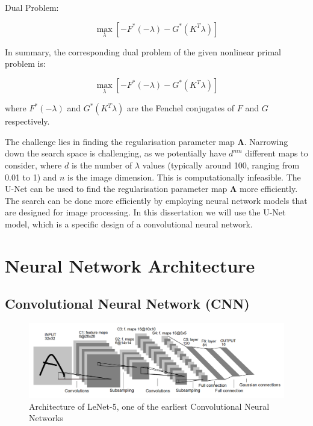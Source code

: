 \documentclass[12pt]{article}
\begin{document}
Dual Problem:

\begin{equation}
\max_{\lambda} \left[ -F^*(-\lambda) - G^*(K^T \lambda) \right]
\end{equation}

In summary, the corresponding dual problem of the given nonlinear primal problem is:

\begin{equation}
\max_{\lambda} \left[ -F^*(-\lambda) - G^*(K^T \lambda) \right]
\end{equation}

where \( F^*(-\lambda) \) and \( G^*(K^T \lambda) \) are the Fenchel conjugates of \( F \) and \( G \) respectively.



The challenge lies in finding the regularisation parameter map $\mathbf{\Lambda}$.  
Narrowing down the search space is challenging, as we potentially have $d^{m n}$ different maps to consider, where $d$ is the number of $\lambda$ values (typically around 100, ranging from 0.01 to 1) and $n$ is the image dimension. This is computationally infeasible. The U-Net can be used to find the 
regularisation parameter map $\mathbf{\Lambda}$
more efficiently.
The search can be done more efficiently by employing neural network models that are designed for image processing. 
In this dissertation we will use the U-Net model, which is a specific design of a convolutional neural network.




\section{Neural Network Architecture}





\subsection{
Convolutional Neural Network (CNN)
}

\begin{figure}[ht]
    \includegraphics[width=1\linewidth]{Le-Net 5.png}
    
    \caption{Architecture of LeNet-5, one of the earliest Convolutional Neural Networks \cite{726791}} 
    \label{fig:lenet}
\end{figure}
\end{document}
